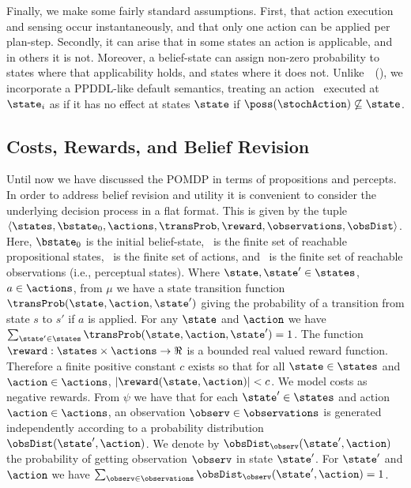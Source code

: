\documentclass{article}
\begin{document}
Finally, we make some fairly standard assumptions. First, that action
execution and sensing occur instantaneously, and that only one action
can be applied per plan-step. Secondly, it can arise that in some
states an action is applicable, and in others it is not. Moreover, a
belief-state can assign non-zero probability to states where that
applicability holds, and states where it does not. %
Unlike~\citeauthor{hoffmann:brafman:2006}~(\citeyear{hoffmann:brafman:2006}),
we incorporate a PPDDL-like default semantics, treating an action
\stochAction\ executed at $\state_i$ as if it has no effect at
states $\state$ if $\poss(\stochAction) \not\subseteq
\state$.


\subsection{Costs, Rewards, and Belief Revision}

Until now we have discussed the POMDP in terms of propositions and
percepts. In order to address belief revision and utility it is
convenient to consider the underlying decision process in a flat
format. This is given by the tuple
$\langle \states, \bstate_0, \actions, \transProb, \reward,
\observations, \obsDist \rangle$. Here, $\bstate_0$ is the initial
belief-state, \states\ is the finite set of reachable propositional
states, \actions\ is the finite set of actions, and \observations\ is
the finite set of reachable observations (i.e., perceptual states).
Where $\state, \state' \in \states$, $a \in \actions$, from $\mu$ we
have a state transition function $\transProb(\state, \action,
\state')$ giving the probability of a transition from state $s$ to
$s'$ if $a$ is applied. For any $\state$ and $\action$ we have
$\sum_{\state' \in \states} \transProb(\state, \action, \state') = 1$.
The function $\reward:\states \times \actions \to \Re$ is a bounded real
valued reward function. Therefore a finite positive constant $c$
exists so that for all $\state \in \states$ and $\action \in
\actions$, $|\reward(\state, \action)| < c$. We model costs as
negative rewards.
From $\psi$ we have that for each $\state' \in \states$ and action
$\action \in \actions$, an observation $\observ \in \observations$ is
generated independently according to a probability distribution
$\obsDist(\state', \action)$. We denote by $\obsDist_\observ(\state',
\action)$ the probability of getting observation $\observ$ in state
$\state'$. For $\state'$ and $\action$ we have $\sum_{\observ \in
\observations} \obsDist_\observ(\state', \action) = 1$.
\end{document}
